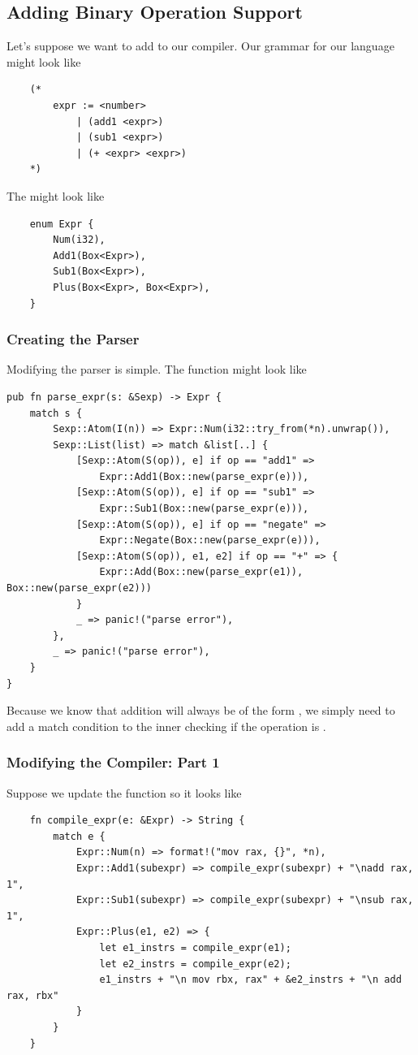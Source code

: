 \subsection{Adding Binary Operation Support}
Let's suppose we want to add  to our compiler. Our grammar for our language might look like 
\begin{verbatim}
    (*
        expr := <number> 
            | (add1 <expr>)
            | (sub1 <expr>)
            | (+ <expr> <expr>) 
    *)\end{verbatim}
The   might look like 
\begin{verbatim}
    enum Expr {
        Num(i32),
        Add1(Box<Expr>),
        Sub1(Box<Expr>),
        Plus(Box<Expr>, Box<Expr>),
    }\end{verbatim} 

\subsubsection{Creating the Parser}
Modifying the parser is simple. The  function might look like 
\begin{verbatim}
pub fn parse_expr(s: &Sexp) -> Expr {
    match s {
        Sexp::Atom(I(n)) => Expr::Num(i32::try_from(*n).unwrap()),
        Sexp::List(list) => match &list[..] {
            [Sexp::Atom(S(op)), e] if op == "add1" => 
                Expr::Add1(Box::new(parse_expr(e))),
            [Sexp::Atom(S(op)), e] if op == "sub1" => 
                Expr::Sub1(Box::new(parse_expr(e))),
            [Sexp::Atom(S(op)), e] if op == "negate" => 
                Expr::Negate(Box::new(parse_expr(e))),
            [Sexp::Atom(S(op)), e1, e2] if op == "+" => {
                Expr::Add(Box::new(parse_expr(e1)), Box::new(parse_expr(e2)))
            }
            _ => panic!("parse error"),
        },
        _ => panic!("parse error"),
    }
}\end{verbatim}
Because we know that addition will always be of the form , we simply need to add a match condition to the inner  checking if the operation is \code{+}. 

\subsubsection{Modifying the Compiler: Part 1}
Suppose we update the  function so it looks like  
\begin{verbatim}
    fn compile_expr(e: &Expr) -> String {
        match e {
            Expr::Num(n) => format!("mov rax, {}", *n),
            Expr::Add1(subexpr) => compile_expr(subexpr) + "\nadd rax, 1",
            Expr::Sub1(subexpr) => compile_expr(subexpr) + "\nsub rax, 1",
            Expr::Plus(e1, e2) => {
                let e1_instrs = compile_expr(e1);
                let e2_instrs = compile_expr(e2);
                e1_instrs + "\n mov rbx, rax" + &e2_instrs + "\n add rax, rbx"
            }
        }
    }\end{verbatim}

